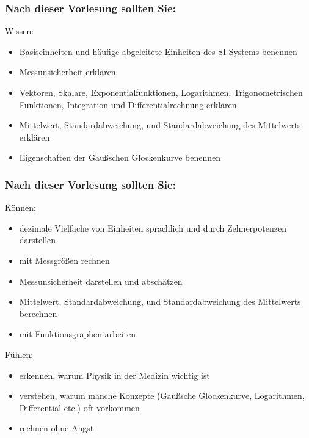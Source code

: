 \documentclass{beamer}
\begin{document}

\begin{frame}

\frametitle{Nach dieser Vorlesung sollten Sie:}



\begin{block}{Wissen:}
\begin{itemize}
\item
Basiseinheiten und häufige abgeleitete Einheiten des SI-Systems benennen
\item
Messunsicherheit erklären
\item
 Vektoren, Skalare, Exponentialfunktionen, Logarithmen, Trigonometrischen Funktionen, Integration und Differentialrechnung erklären
\item 
Mittelwert, Standardabweichung, und Standardabweichung des Mittelwerts erklären 
\item
Eigenschaften der Gaußschen Glockenkurve benennen
\end{itemize}
\end{block}

\end{frame}

\begin{frame}

\frametitle{Nach dieser Vorlesung sollten Sie:}
 



\begin{block}{Können:}
\begin{itemize}
\item
 dezimale Vielfache von Einheiten sprachlich und durch Zehnerpotenzen darstellen
\item
 mit Messgrößen rechnen
\item
 Messunsicherheit darstellen und abschätzen
\item
 Mittelwert, Standardabweichung, und Standardabweichung des Mittelwerts berechnen
\item 
mit Funktionsgraphen arbeiten
\end{itemize}
\end{block}

\pause
 
\begin{block}{Fühlen:}
\begin{itemize}
\item
erkennen, warum Physik in der Medizin wichtig ist
\item
verstehen, warum manche Konzepte (Gaußsche Glockenkurve, Logarithmen, Differential etc.) oft vorkommen
\item
 rechnen ohne Angst
\end{itemize}
\end{block}

\end{frame}
\end{document}
